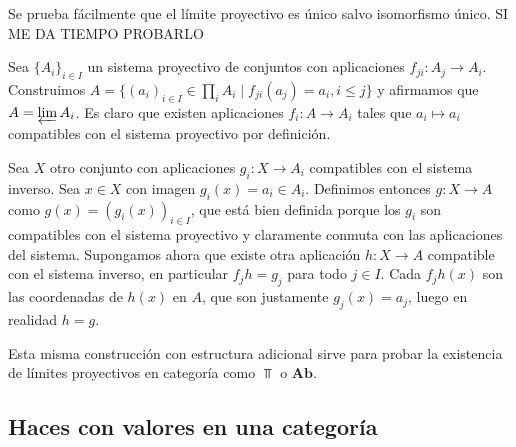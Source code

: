 \documentclass[twoside]{article}
\begin{document}
Se prueba fácilmente que el límite proyectivo es único salvo isomorfismo único. SI ME DA TIEMPO PROBARLO


\begin{ej}\label{set}
Sea $\{A_i\}_{i\in I}$ un sistema proyectivo de conjuntos con aplicaciones $f_{ji}:A_j\to A_{i}$. Construimos $A=\{(a_i)_{i\in I}\in \prod_i A_i\mid f_{ji}(a_j)=a_i, i\leq j\}$ y afirmamos que $A=\varprojlim A_i$. Es claro que existen aplicaciones $f_i:A \to A_i$ tales que $a_i\mapsto a_i$ compatibles con el sistema proyectivo por definición.

Sea $X$ otro conjunto con aplicaciones $g_i:X\to A_i$ compatibles con el sistema inverso. Sea $x\in X$ con imagen $g_i(x)=a_i\in A_i$. Definimos entonces $g:X\to A$ como $g(x)=(g_i(x))_{i\in I}$, que está bien definida porque los $g_i$ son compatibles con el sistema proyectivo y claramente conmuta con las aplicaciones del sistema. Supongamos ahora que existe otra aplicación $h:X\to A$ compatible con el sistema inverso, en particular $f_jh=g_j$ para todo $j\in I$. Cada $f_jh(x)$ son las coordenadas de $h(x)$ en $A$, que son justamente $g_j(x)=a_j$, luego en realidad $h=g$. 

Esta misma construcción con estructura adicional sirve para probar la existencia de límites proyectivos en categoría como $\Top$ o $\mathrm{\mathbf{Ab}}$.
\end{ej}

\subsection{Haces con valores en una categoría}
\end{document}

